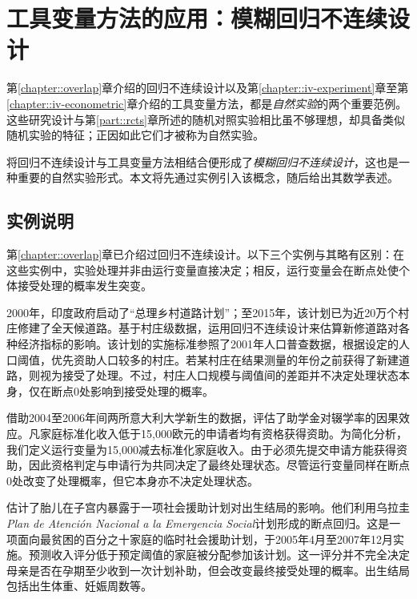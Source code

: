  
\chapter{工具变量方法的应用：模糊回归不连续设计}
 \label{chapter::iv-frdd}



第\ref{chapter::overlap}章介绍的回归不连续设计以及第\ref{chapter::iv-experiment}章至第\ref{chapter::iv-econometric}章介绍的工具变量方法，都是{\it 自然实验}的两个重要范例。这些研究设计与第\ref{part::rcts}章所述的随机对照实验相比虽不够理想，却具备类似随机实验的特征；正因如此它们才被称为自然实验。 


将回归不连续设计与工具变量方法相结合便形成了{\it 模糊回归不连续设计}，这也是一种重要的自然实验形式。本文将先通过实例引入该概念，随后给出其数学表述。  




\section{实例说明}
\label{sec::frdd-motivation}

第\ref{chapter::overlap}章已介绍过回归不连续设计。以下三个实例与其略有区别：在这些实例中，实验处理并非由运行变量直接决定；相反，运行变量会在断点处使个体接受处理的概率发生突变。 

\begin{example}\label{eg::indianroad}
2000年，印度政府启动了“总理乡村道路计划”；至2015年，该计划已为近20万个村庄修建了全天候道路。\citet{asher2020rural}基于村庄级数据，运用回归不连续设计来估算新修道路对各种经济指标的影响。该计划的实施标准参照了2001年人口普查数据，根据设定的人口阈值，优先资助人口较多的村庄。若某村庄在结果测量的年份之前获得了新建道路，则视为接受了处理。不过，村庄人口规模与阈值间的差距并不决定处理状态本身，仅在断点0处影响到接受处理的概率。
\end{example}


\begin{example}\label{eg::italianuniversity}
\citet{li2015evaluating}借助2004至2006年间两所意大利大学新生的数据，评估了助学金对辍学率的因果效应。凡家庭标准化收入低于15,000欧元的申请者均有资格获得资助。为简化分析，我们定义运行变量为15,000减去标准化家庭收入。由于必须先提交申请方能获得资助，因此资格判定与申请行为共同决定了最终处理状态。尽管运行变量同样在断点0处改变了处理概率，但它本身亦不决定处理状态。 
\end{example}



\begin{example}
\citet{amarante2016cash}估计了胎儿在子宫内暴露于一项社会援助计划对出生结局的影响。他们利用乌拉圭{\it Plan de Atención Nacional a la Emergencia Social}计划形成的断点回归。这是一项面向最贫困的百分之十家庭的临时社会援助计划，于2005年4月至2007年12月实施。预测收入评分低于预定阈值的家庭被分配参加该计划。这一评分并不完全决定母亲是否在孕期至少收到一次计划补助，但会改变最终接受处理的概率。出生结局包括出生体重、妊娠周数等。 
\end{example}



